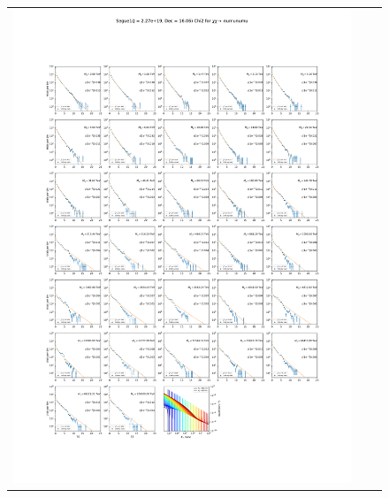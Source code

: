 \begin{figure}[!hb]
{\begin{tabular}{ccc}
            \includegraphics[clip, trim=22.1cm 6.5cm 19.5cm 56.5cm, scale=0.55]{figures/ic_DM/dm_plots/Segue1_numunumu_chi2_Masspanel_2024-04-28.pdf} &

\end{tabular}}
\end{figure}
